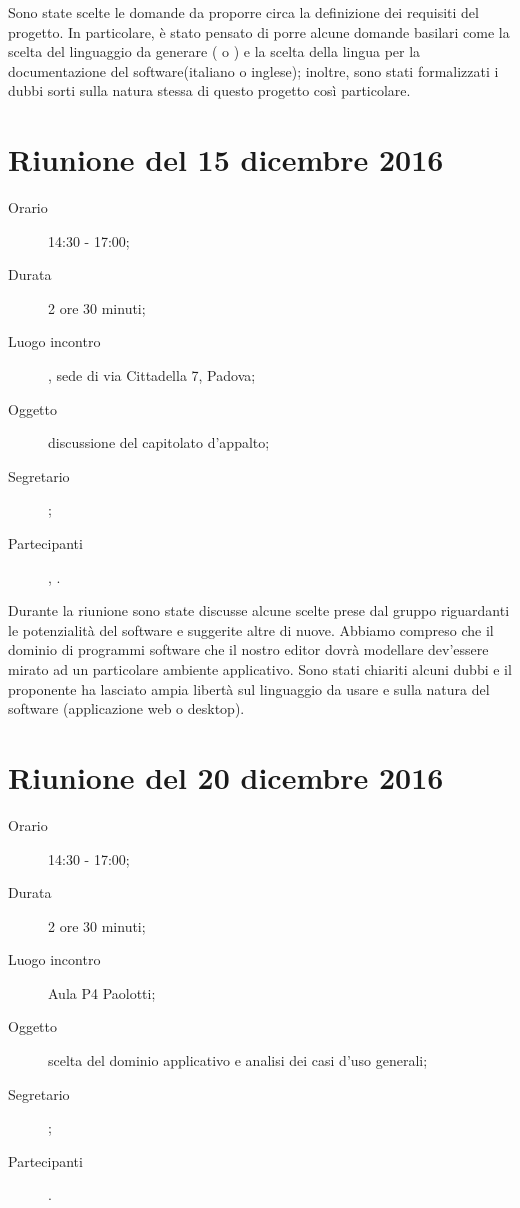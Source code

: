 Sono state scelte le domande da proporre circa la definizione dei requisiti del progetto. In particolare, è stato pensato di porre alcune domande basilari come la scelta del linguaggio da generare ( o ) e la scelta della lingua per la documentazione del software(italiano o inglese); inoltre, sono stati formalizzati i dubbi sorti sulla natura stessa di questo progetto così particolare.



\section{Riunione del 15 dicembre 2016}

\begin{description}
	\item[Orario] 14:30 - 17:00;
	\item[Durata] 2 ore 30 minuti;
	\item[Luogo incontro] \ZU, sede di via Cittadella 7, Padova; 
	\item[Oggetto] discussione del capitolato d'appalto;
	\item[Segretario] \LS; 
	\item[Partecipanti] \GP, \ALL.
\end{description}

Durante la riunione sono state discusse alcune scelte prese dal gruppo riguardanti le potenzialità del software e suggerite altre di nuove. Abbiamo compreso che il dominio di programmi software che il nostro editor dovrà modellare dev'essere mirato ad un particolare ambiente applicativo. Sono stati chiariti alcuni dubbi e il proponente ha lasciato ampia libertà sul linguaggio da usare e sulla natura del software (applicazione web o desktop).



\section{Riunione del 20 dicembre 2016}

\begin{description}
	\item[Orario] 14:30 - 17:00;
	\item[Durata] 2 ore 30 minuti;
	\item[Luogo incontro] Aula P4 Paolotti; 
	\item[Oggetto] scelta del dominio applicativo e analisi dei casi d'uso generali;
	\item[Segretario] \PB; 
	\item[Partecipanti] \ALL.
\end{description}

